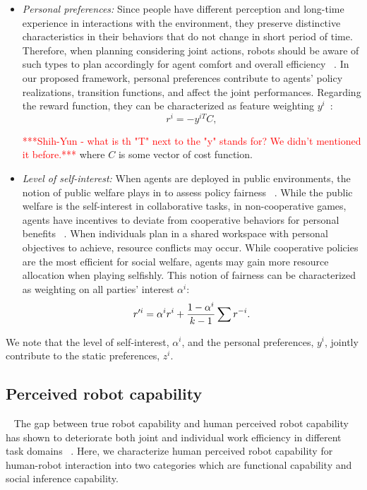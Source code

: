 \documentclass[letterpaper, 10 pt, conference]{ieeeconf}  %
\begin{document}
\begin{itemize}
	\item \textit{Personal preferences:} Since people have different perception and long-time experience in interactions with the environment, they preserve distinctive characteristics in their behaviors that do not change in short period of time. Therefore, when planning considering joint actions, robots should be aware of such types to plan accordingly for agent comfort and overall efficiency ~\cite{gombolay2015coordination}. In our proposed framework, personal preferences contribute to agents' policy realizations, transition functions, and affect the joint performances. Regarding the reward function, they can be characterized as feature weighting $y^i$~\cite{dorsa2017active}:
	\begin{equation}
	r^i = -y^{iT}C, 
	\end{equation}
	
	\textcolor{red}{***Shih-Yun - what is th "T" next to the "y" stands for? We didn't mentioned it before.*** } where $C$ is some vector of cost function.
	\item \textit{Level of self-interest:} When agents are deployed in public environments, the notion of public welfare plays in to assess policy fairness ~\cite{fehr2004social}. While the public welfare is the self-interest in collaborative tasks, in non-cooperative games, agents have incentives to deviate from cooperative behaviors for personal benefits ~\cite{fujiwara2015non}. When individuals plan in a shared workspace with personal objectives to achieve, resource conflicts may occur. 
	While cooperative policies are the most efficient for social welfare, agents may gain more resource allocation when playing selfishly. This notion of fairness can be characterized as weighting on all parties' interest $\alpha^i$:
	\begin{equation}
	r'^{i} = \alpha^ir^i+ \small{\frac{1-\alpha^i}{k-1}}\sum r^{-i}.
	\end{equation}
	
\end{itemize}

We note that the level of self-interest, $\alpha^i$, and the personal preferences, $y^i$, jointly contribute to the static preferences, $z^i$.

\subsection{Perceived robot capability}~\label{sec:perceived}
The gap between true robot capability and human perceived robot capability has shown to deteriorate both joint and individual work efficiency in different task domains ~\cite{dragan2015effects}. Here, we characterize human perceived robot capability for human-robot interaction into two categories which are functional capability and social inference capability.
\end{document}
